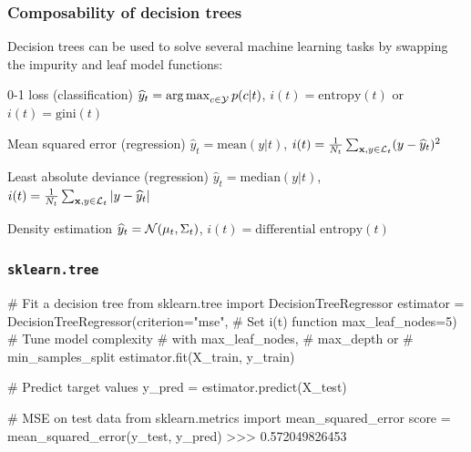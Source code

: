 \documentclass{beamer}
\DeclareMathOperator*{\argmax}{arg\,max}
\begin{document}
\begin{frame}
    \frametitle{Composability of decision trees}

    Decision trees can be used to solve several machine learning tasks by
    swapping the impurity and leaf model functions:

    \vspace{0.5cm}

    \begin{block}{0-1 loss (classification)}
    $\widehat{y}_t = \argmax_{c \in {\cal Y}} p(c|t)$, $i(t) = \text{entropy}(t)$ or $i(t) = \text{gini}(t)$
    \end{block}

    \begin{block}{Mean squared error (regression)}
    $\widehat{y}_t = \text{mean}(y|t)$, $i(t) = \frac{1}{N_t} \sum_{\mathbf{x}, y \in {\cal L}_t} (y - \widehat{y}_t)^2$
    \end{block}

    \begin{block}{Least absolute deviance (regression)}
    $\widehat{y}_t = \text{median}(y|t)$, $i(t) = \frac{1}{N_t} \sum_{\mathbf{x}, y \in {\cal L}_t} |y - \widehat{y}_t|$
    \end{block}

    \begin{block}{Density estimation}
    $\widehat{y}_t = {\cal N}(\mu_t, \Sigma_t)$, $i(t) = \text{differential entropy}(t)$
    \end{block}
\end{frame}

\begin{frame}[fragile]
    \frametitle{\texttt{sklearn.tree}}

{\scriptsize
\begin{pythoncode}
# Fit a decision tree
from sklearn.tree import DecisionTreeRegressor
estimator = DecisionTreeRegressor(criterion="mse",   # Set i(t) function
                                  max_leaf_nodes=5)  # Tune model complexity
                                                     # with max_leaf_nodes,
                                                     # max_depth or
                                                     # min_samples_split
estimator.fit(X_train, y_train)

# Predict target values
y_pred = estimator.predict(X_test)

# MSE on test data
from sklearn.metrics import mean_squared_error
score = mean_squared_error(y_test, y_pred)
>>> 0.572049826453
\end{pythoncode}
}

\end{frame}
\end{document}
